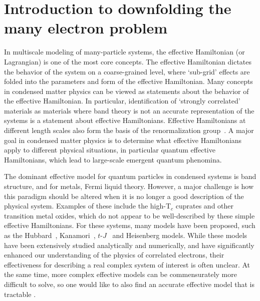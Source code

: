 \section{Introduction to downfolding the many electron problem}

In multiscale modeling of many-particle systems, the effective Hamiltonian (or Lagrangian) is one of the most core concepts. 
The effective Hamiltonian dictates the behavior of the system on a coarse-grained level, where `sub-grid' effects are folded into the parameters and form of the effective Hamiltonian. 
Many concepts in condensed matter physics can be viewed as statements about the behavior of the effective Hamiltonian. 
In particular, identification of `strongly correlated' materials as materials where band theory is not an accurate representation of the systems is a statement about effective Hamiltonians.
Effective Hamiltonians at different length scales also form the basis of the renormalization group~\cite{Wilson}.
A major goal in condensed matter physics is to determine what effective Hamiltonians apply to different physical situations, in particular quantum effective Hamiltonians, which lead to large-scale emergent quantum phenomina. 

The dominant effective model for quantum particles in condensed systems is band structure, and for metals, Fermi liquid theory. 
However, a major challenge is how this paradigm should be altered when it is no longer a good description of the physical system.
Examples of these include the high-T$_c$ cuprates and other transition metal oxides, which do not appear to be well-described by these simple effective Hamiltonians. 
For these systems, many models have been proposed, such as the Hubbard~\cite{Hubbard1963}, Kanamori~\cite{Kanamori1963}, $t$-$J$~\cite{tJSpalek} and Heisenberg models.
While these models have been extensively studied analytically and numerically, and have significantly enhanced our understanding of the physics of correlated electrons, their effectiveness for describing a real complex system of interest is often unclear. 
At the same time, more complex effective models can be commensurately more difficult to solve,  so one would like to also find an accurate effective model that is tractable . 


